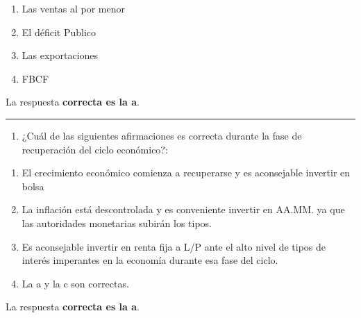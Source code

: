 \documentclass[
  letterpaper,
  DIV=11,
  numbers=noendperiod]{scrreprt}
\providecommand{\tightlist}{%
  \setlength{\itemsep}{0pt}\setlength{\parskip}{0pt}}\usepackage{longtable,booktabs,array}
\begin{document}
\begin{enumerate}
\def\labelenumi{\alph{enumi}.}
\item
  Las ventas al por menor
\item
  El déficit Publico
\item
  Las exportaciones
\item
  FBCF
\end{enumerate}

\begin{tcolorbox}[enhanced jigsaw, left=2mm, opacityback=0, colback=white, breakable, arc=.35mm, bottomrule=.15mm, rightrule=.15mm, toprule=.15mm, leftrule=.75mm, colframe=quarto-callout-tip-color-frame]
\begin{minipage}[t]{5.5mm}
\textcolor{quarto-callout-tip-color}{\faLightbulb}
\end{minipage}%
\begin{minipage}[t]{\textwidth - 5.5mm}

La respuesta \textbf{correcta es la a}.

\end{minipage}%
\end{tcolorbox}

\begin{center}\rule{0.5\linewidth}{0.5pt}\end{center}

\begin{enumerate}
\def\labelenumi{\arabic{enumi}.}
\setcounter{enumi}{63}
\tightlist
\item
  ¿Cuál de las siguientes afirmaciones es correcta durante la fase de
  recuperación del ciclo económico?:
\end{enumerate}

\begin{enumerate}
\def\labelenumi{\alph{enumi}.}
\item
  El crecimiento económico comienza a recuperarse y es aconsejable
  invertir en bolsa
\item
  La inflación está descontrolada y es conveniente invertir en AA.MM. ya
  que las autoridades monetarias subirán los tipos.
\item
  Es aconsejable invertir en renta fija a L/P ante el alto nivel de
  tipos de interés imperantes en la economía durante esa fase del ciclo.
\item
  La a y la c son correctas.
\end{enumerate}

\begin{tcolorbox}[enhanced jigsaw, left=2mm, opacityback=0, colback=white, breakable, arc=.35mm, bottomrule=.15mm, rightrule=.15mm, toprule=.15mm, leftrule=.75mm, colframe=quarto-callout-tip-color-frame]
\begin{minipage}[t]{5.5mm}
\textcolor{quarto-callout-tip-color}{\faLightbulb}
\end{minipage}%
\begin{minipage}[t]{\textwidth - 5.5mm}

La respuesta \textbf{correcta es la a}.

\end{minipage}%
\end{tcolorbox}
\end{document}
